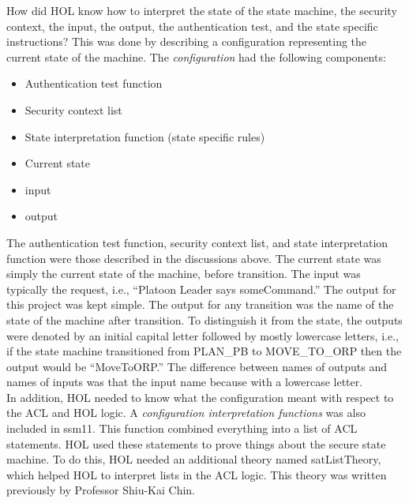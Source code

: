   How did HOL know how to interpret the state of the state machine, the security context, the input,
  the output, the authentication test, and the state specific instructions? This was done by describing
  a configuration representing the current state of the machine. The \textit{configuration} had the following
  components:
  \begin{itemize}
  \item Authentication test function
  \item Security context list
  \item State interpretation function (state specific rules)
  \item Current state
  \item input
  \item output
  \end{itemize}
  The authentication test function, security context list, and state interpretation function were
  those described in the discussions above. The current state was simply the current state of the
  machine, before transition. The input was typically the request, i.e., “Platoon Leader says someCommand.”
  The output for this project was kept simple. The output for any transition was the name of the state
  of the machine after transition. To distinguish it from the state, the outputs were denoted by an
  initial capital letter followed by mostly lowercase letters, i.e., if the state machine transitioned
  from PLAN_PB to MOVE_TO_ORP then the output would be “MoveToORP.” The difference between names of
  outputs and names of inputs was that the input name because with a lowercase letter.\\

  In addition, HOL needed to know what the configuration meant with respect to the ACL and HOL logic. A
  \textit{configuration interpretation functions} was also included in ssm11. This function combined everything
  into a list of ACL statements. HOL used these statements to prove things about the secure state machine.
  To do this, HOL needed an additional theory named satListTheory, which helped HOL to interpret lists
  in the ACL logic. This theory was written previously by Professor Shiu-Kai Chin.\\


